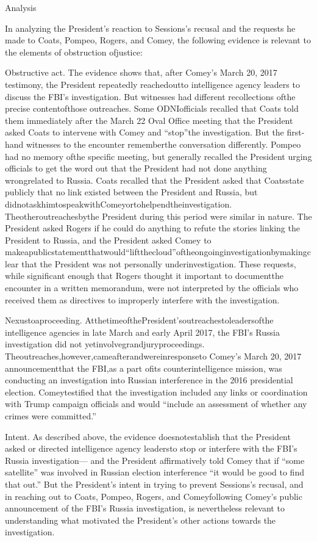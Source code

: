 Analysis

In analyzing the President’s reaction to Sessions’s recusal and the requests he made to Coats, Pompeo, Rogers, and Comey, the following evidence is relevant to the elements of obstruction ofjustice:

Obstructive act.
The evidence shows that, after Comey’s March 20, 2017 testimony, the President repeatedly reachedoutto intelligence agency leaders to discuss the FBI’s investigation.
But witnesses had different recollections ofthe precise contentofthose outreaches.
Some ODNIofficials recalled that Coats told them immediately after the March 22 Oval Office meeting that the President asked Coats to intervene with Comey and “stop”the investigation.
But the first-hand witnesses to the encounter rememberthe conversation differently.
Pompeo had no memory ofthe specific meeting, but generally recalled the President urging officials to get the word out that the President had not done anything wrongrelated to Russia.
Coats recalled that the President asked that Coatsstate publicly that no link existed between the President and Russia, but didnotaskhimtospeakwithComeyortohelpendtheinvestigation.
Theotheroutreachesbythe President during this period were similar in nature.
The President asked Rogers if he could do anything to refute the stories linking the President to Russia, and the President asked Comey to makeapublicstatementthatwould“liftthecloud”oftheongoinginvestigationbymakingclear that the President was not personally underinvestigation.
These requests, while significant enough that Rogers thought it important to documentthe encounter in a written memorandum, were not
interpreted by the officials who received them as directives to improperly interfere with the investigation.

Nexustoaproceeding.
AtthetimeofthePresident’soutreachestoleadersofthe intelligence agencies in late March and early April 2017, the FBI’s Russia investigation did not yetinvolvegrandjuryproceedings.
Theoutreaches,however,cameafterandwereinresponseto Comey’s March 20, 2017 announcementthat the FBI,as a part ofits counterintelligence mission, was conducting an investigation into Russian interference in the 2016 presidential election.
Comeytestified that the investigation included any links or coordination with Trump campaign officials and would “include an assessment of whether any crimes were committed.”

Intent.
As described above, the evidence doesnotestablish that the President asked or directed intelligence agency leadersto stop or interfere with the FBI’s Russia investigation— and the President affirmatively told Comey that if “some satellite” was involved in Russian election interference “it would be good to find that out.”
But the President’s intent in trying to prevent Sessions’s recusal, and in reaching out to Coats, Pompeo, Rogers, and Comeyfollowing Comey’s public announcement of the FBI’s Russia investigation, is nevertheless relevant to understanding what motivated the President’s other actions towards the investigation.

